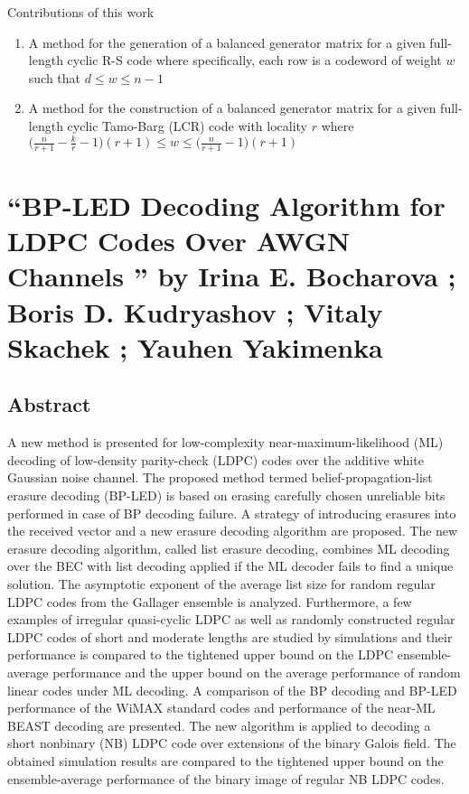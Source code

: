 \documentclass[11pt, oneside, dvipdfmx]{book}
\begin{document}
\begin{MyDefinition}{Contributions of this work} 


\begin{enumerate}
\item A method for the generation of a balanced generator matrix for a given full-length cyclic R-S code where specifically, each row is a codeword of weight $w$ such that $d \leq w \leq n-1$

\item A method for the construction of a balanced generator matrix for a given full-length cyclic Tamo-Barg (LCR) code with locality $r$ where $\Bigg ( \frac{n}{r+1} -\frac{k}{r} -1\Bigg) (r+1) \leq w \leq \Bigg ( \frac{n}{r+1}  -1\Bigg)(r+1)$
\end{enumerate}

\end{MyDefinition}


\chapter{``BP-LED Decoding Algorithm for LDPC Codes Over AWGN Channels '' by Irina E. Bocharova  ; Boris D. Kudryashov  ; Vitaly Skachek  ; Yauhen Yakimenka }


\section{Abstract}
A new method is presented for low-complexity near-maximum-likelihood (ML) decoding of low-density parity-check (LDPC) codes over the additive white Gaussian noise channel. The proposed method termed belief-propagation-list erasure decoding (BP-LED) is based on erasing carefully chosen unreliable bits performed in case of BP decoding failure. A strategy of introducing erasures into the received vector and a new erasure decoding algorithm are proposed. The new erasure decoding algorithm, called list erasure decoding, combines ML decoding over the BEC with list decoding applied if the ML decoder fails to find a unique solution. The asymptotic exponent of the average list size for random regular LDPC codes from the Gallager ensemble is analyzed. Furthermore, a few examples of irregular quasi-cyclic LDPC as well as randomly constructed regular LDPC codes of short and moderate lengths are studied by simulations and their performance is compared to the tightened upper bound on the LDPC ensemble-average performance and the upper bound on the average performance of random linear codes under ML decoding. A comparison of the BP decoding and BP-LED performance of the WiMAX standard codes and performance of the near-ML BEAST decoding are presented. The new algorithm is applied to decoding a short nonbinary (NB) LDPC code over extensions of the binary Galois field. The obtained simulation results are compared to the tightened upper bound on the ensemble-average performance of the binary image of regular NB LDPC codes.
\end{document}
